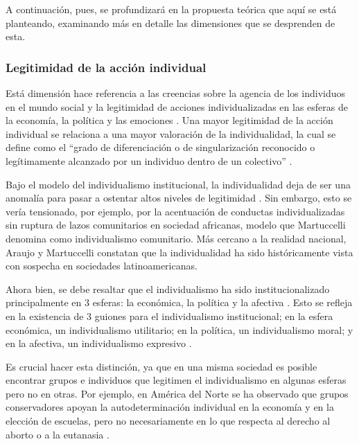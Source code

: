 \documentclass[12pt,twoside]{templates/facsothesis}
\begin{document}
A continuación, pues, se profundizará en la propuesta teórica que aquí se está planteando, examinando más en detalle las dimensiones que se desprenden de esta.

\hypertarget{legitimidad-de-la-acciuxf3n-individual}{%
\subsubsection{Legitimidad de la acción individual}\label{legitimidad-de-la-acciuxf3n-individual}}

Está dimensión hace referencia a las creencias sobre la agencia de los individuos en el mundo social \citep{brewer2007} y la legitimidad de acciones individualizadas en las esferas de la economía, la política y las emociones \citep{cortois2018}. Una mayor legitimidad de la acción individual se relaciona a una mayor valoración de la individualidad, la cual se define como el ``grado de diferenciación o de singularización reconocido o legítimamente alcanzado por un individuo dentro de un colectivo'' \citep[p.~10]{martuccelli2018}.

Bajo el modelo del individualismo institucional, la individualidad deja de ser una anomalía para pasar a ostentar altos niveles de legitimidad \citep{martuccelli2018}. Sin embargo, esto se vería tensionado, por ejemplo, por la acentuación de conductas individualizadas sin ruptura de lazos comunitarios en sociedad africanas, modelo que Martuccelli \citeyearpar{martuccelli2018} denomina como individualismo comunitario. Más cercano a la realidad nacional, Araujo y Martuccelli \citeyearpar{araujo2020a} constatan que la individualidad ha sido históricamente vista con sospecha en sociedades latinoamericanas.

Ahora bien, se debe resaltar que el individualismo ha sido institucionalizado principalmente en 3 esferas: la económica, la política y la afectiva \citep{cortois2018, martuccelli2018}. Esto se refleja en la existencia de 3 guiones para el individualismo institucional; en la esfera económica, un individualismo utilitario; en la política, un individualismo moral; y en la afectiva, un individualismo expresivo \citep{cortois2018}.

Es crucial hacer esta distinción, ya que en una misma sociedad es posible encontrar grupos e individuos que legitimen el individualismo en algunas esferas pero no en otras. Por ejemplo, en América del Norte se ha observado que grupos conservadores apoyan la autodeterminación individual en la economía y en la elección de escuelas, pero no necesariamente en lo que respecta al derecho al aborto o a la eutanasia \citep{kemmelmeier2003}.
\end{document}
